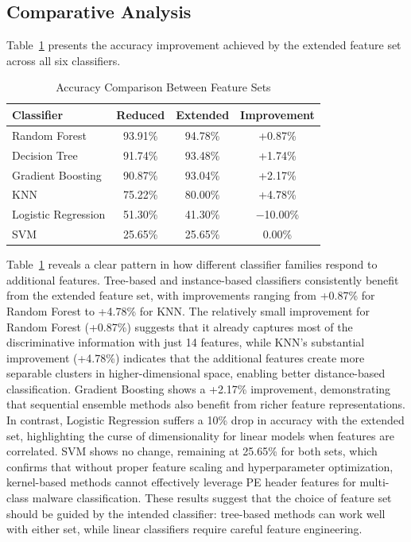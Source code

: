 \documentclass[conference,a4paper]{IEEEtran}
\begin{document}
\subsection{Comparative Analysis}

Table~\ref{tab:comparison} presents the accuracy improvement achieved by the extended feature set across all six classifiers.

\begin{table}[!htbp]
\centering
\caption{Accuracy Comparison Between Feature Sets}
\label{tab:comparison}
\begin{tabular}{lccc}
\toprule
\textbf{Classifier} & \textbf{Reduced} & \textbf{Extended} & \textbf{Improvement} \\
\midrule
Random Forest & 93.91\% & 94.78\% & +0.87\% \\
Decision Tree & 91.74\% & 93.48\% & +1.74\% \\
Gradient Boosting & 90.87\% & 93.04\% & +2.17\% \\
KNN & 75.22\% & 80.00\% & +4.78\% \\
Logistic Regression & 51.30\% & 41.30\% & $-$10.00\% \\
SVM & 25.65\% & 25.65\% & 0.00\% \\
\bottomrule
\end{tabular}
\end{table}

Table~\ref{tab:comparison} reveals a clear pattern in how different classifier families respond to additional features. Tree-based and instance-based classifiers consistently benefit from the extended feature set, with improvements ranging from +0.87\% for Random Forest to +4.78\% for KNN. The relatively small improvement for Random Forest (+0.87\%) suggests that it already captures most of the discriminative information with just 14 features, while KNN's substantial improvement (+4.78\%) indicates that the additional features create more separable clusters in higher-dimensional space, enabling better distance-based classification. Gradient Boosting shows a +2.17\% improvement, demonstrating that sequential ensemble methods also benefit from richer feature representations. In contrast, Logistic Regression suffers a 10\% drop in accuracy with the extended set, highlighting the curse of dimensionality for linear models when features are correlated. SVM shows no change, remaining at 25.65\% for both sets, which confirms that without proper feature scaling and hyperparameter optimization, kernel-based methods cannot effectively leverage PE header features for multi-class malware classification. These results suggest that the choice of feature set should be guided by the intended classifier: tree-based methods can work well with either set, while linear classifiers require careful feature engineering.
\end{document}
